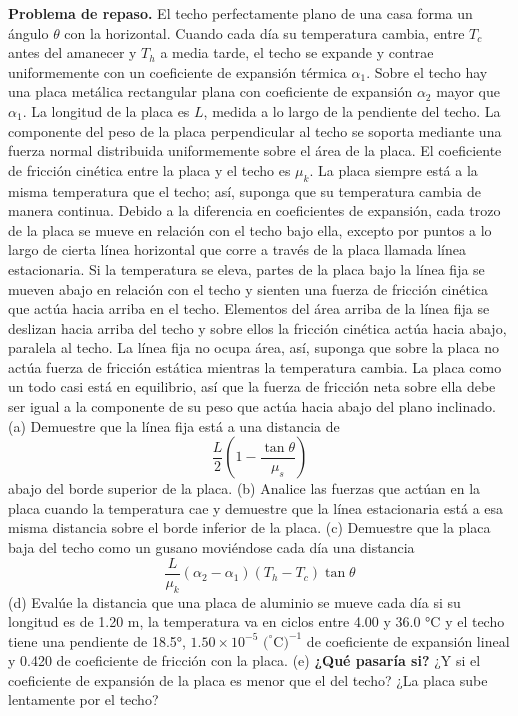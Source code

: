 \item \textbf{Problema de repaso.} El techo perfectamente plano de una casa forma un ángulo $\theta$ con la horizontal. Cuando cada día su temperatura cambia, entre $T_c$ antes del amanecer y $T_h$ a media tarde, el techo se expande y contrae uniformemente con un coeficiente de expansión térmica $\alpha_1$. Sobre el techo hay una placa metálica rectangular plana con coeficiente de expansión $\alpha_2$ mayor que $\alpha_1$. La longitud de la placa es $L$, medida a lo largo de la pendiente del techo. La componente del peso de la placa perpendicular al techo se soporta mediante una fuerza normal distribuida uniformemente sobre el área de la placa. El coeficiente de fricción cinética entre la placa y el techo es $\mu_k$. La placa siempre está a la misma temperatura que el techo; así, suponga que su temperatura cambia de manera continua. Debido a la diferencia en coeficientes de expansión, cada trozo de la placa se mueve en relación con el techo bajo ella, excepto por puntos a lo largo de cierta línea horizontal que corre a través de la placa llamada línea estacionaria. Si la temperatura se eleva, partes de la placa bajo la línea fija se mueven abajo en relación con el techo y sienten una fuerza de fricción cinética que actúa hacia arriba en el techo. Elementos del área arriba de la línea fija se deslizan hacia arriba del techo y sobre ellos la fricción cinética actúa hacia abajo, paralela al techo. La línea fija no ocupa área, así, suponga que sobre la placa no actúa fuerza de fricción estática mientras la temperatura cambia. La placa como un todo casi está en equilibrio, así que la fuerza de fricción neta sobre ella debe ser igual a la componente de su peso que actúa hacia abajo del plano inclinado. 
(a) Demuestre que la línea fija está a una distancia de
$$\frac{L}{2} \left( 1 - \frac{\tan \theta}{\mu_s} \right)$$
abajo del borde superior de la placa. 
(b) Analice las fuerzas que actúan en la placa cuando la temperatura cae y demuestre que la línea estacionaria está a esa misma distancia sobre el borde inferior de la placa. 
(c) Demuestre que la placa baja del techo como un gusano moviéndose cada día una distancia
$$\frac{L}{\mu_k} (\alpha_2 - \alpha_1)(T_h - T_c) \tan \theta$$
(d) Evalúe la distancia que una placa de aluminio se mueve cada día si su longitud es de 1.20 m, la temperatura va en ciclos entre 4.00 y 36.0 °C y el techo tiene una pendiente de 18.5°, $1.50 \times 10^{-5} \text{ (}^\circ\text{C)}^{-1}$ de coeficiente de expansión lineal y 0.420 de coeficiente de fricción con la placa. 
(e) \textbf{¿Qué pasaría si?} ¿Y si el coeficiente de expansión de la placa es menor que el del techo? ¿La placa sube lentamente por el techo?

